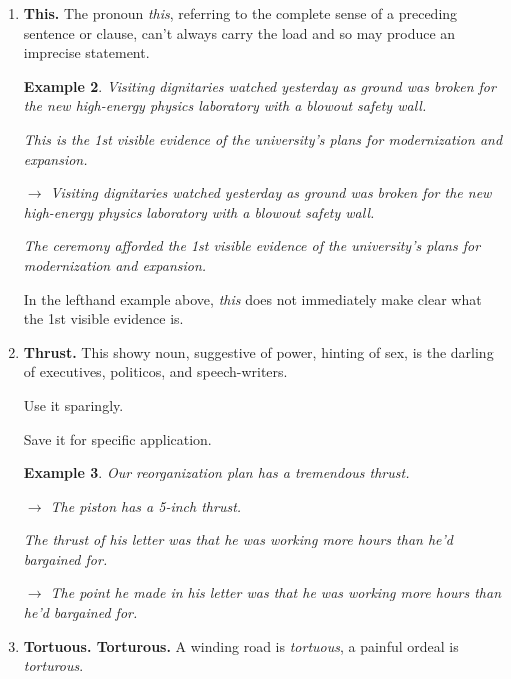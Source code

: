 \documentclass{book}
\numberwithin{equation}{section}
\newtheorem{example}{Example}[chapter]
\begin{document}
\begin{enumerate}
\begin{example}
        $\to$ As a writer, you must address your readers' concerns.
    \end{example}
    No one need fear to use \textit{he} if common sense supports it.
    
    If you think \textit{she} is a handy substitute for \textit{he}, try it and see what happens.
    
    Alternatively, put all controversial nouns in the plural and avoid the choice of sex altogether, although you may find your prose sounding general and diffuse as a result.
    \item \textbf{This.} The pronoun \textit{this}, referring to the complete sense of a preceding sentence or clause, can't always carry the load and so may produce an imprecise statement.
    \begin{example}
        Visiting dignitaries watched yesterday as ground was broken for the new high-energy physics laboratory with a blowout safety wall.
        
        This is the 1st visible evidence of the university's plans for modernization and expansion.
        
        $\to$ Visiting dignitaries watched yesterday as ground was broken for the new high-energy physics laboratory with a blowout safety wall.
        
        The ceremony afforded the 1st visible evidence of the university's plans for modernization and expansion.
    \end{example}
    In the lefthand example above, \textit{this} does not immediately make clear what the 1st visible evidence is.
    \item \textbf{Thrust.} This showy noun, suggestive of power, hinting of sex, is the darling of executives, politicos, and speech-writers.
    
    Use it sparingly.
    
    Save it for specific application.
    \begin{example}
        Our reorganization plan has a tremendous thrust.
        
        $\to$ The piston has a 5-inch thrust.
        
        The thrust of his letter was that he was working more hours than he'd bargained for.
        
        $\to$ The point he made in his letter was that he was working more hours than he'd bargained for.
    \end{example}
    \item \textbf{Tortuous. Torturous.} A winding road is \textit{tortuous}, a painful ordeal is \textit{torturous}.
    

\end{enumerate}
\end{document}
